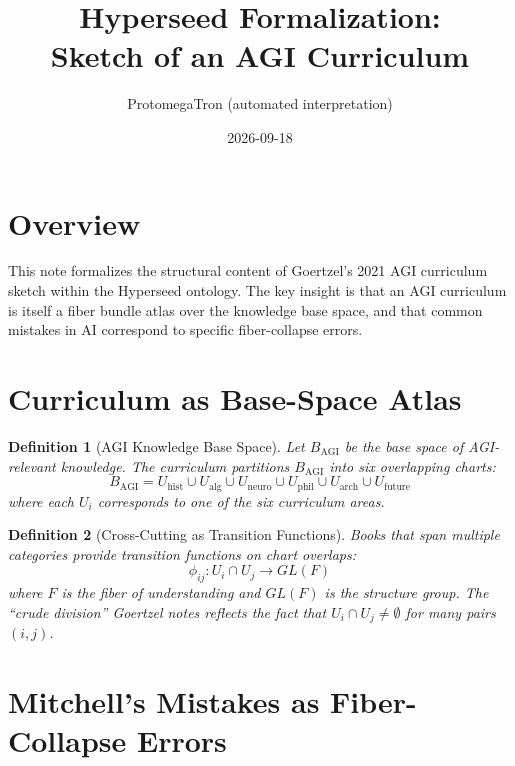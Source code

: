 \documentclass[11pt]{article}
\title{Hyperseed Formalization:\\Sketch of an AGI Curriculum}
\author{ProtomegaTron (automated interpretation)}
\date{2026-09-18}
\newtheorem{definition}{Definition}
\begin{document}
\maketitle

\section{Overview}

This note formalizes the structural content of Goertzel's 2021 AGI
curriculum sketch within the Hyperseed ontology. The key insight is that
an AGI curriculum is itself a fiber bundle atlas over the knowledge base
space, and that common mistakes in AI correspond to specific
fiber-collapse errors.

\section{Curriculum as Base-Space Atlas}

\begin{definition}[AGI Knowledge Base Space]
Let $B_{\text{AGI}}$ be the base space of AGI-relevant knowledge. The
curriculum partitions $B_{\text{AGI}}$ into six overlapping charts:
\[
  B_{\text{AGI}} = U_{\text{hist}} \cup U_{\text{alg}} \cup
  U_{\text{neuro}} \cup U_{\text{phil}} \cup U_{\text{arch}} \cup
  U_{\text{future}}
\]
where each $U_i$ corresponds to one of the six curriculum areas.
\end{definition}

\begin{definition}[Cross-Cutting as Transition Functions]
Books that span multiple categories provide transition functions on
chart overlaps:
\[
  \phi_{ij}: U_i \cap U_j \to GL(F)
\]
where $F$ is the fiber of understanding and $GL(F)$ is the structure
group. The ``crude division'' Goertzel notes reflects the fact that
$U_i \cap U_j \neq \emptyset$ for many pairs $(i,j)$.
\end{definition}

\section{Mitchell's Mistakes as Fiber-Collapse Errors}
\end{document}
